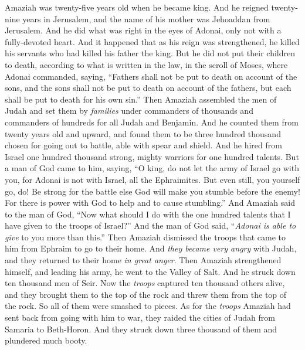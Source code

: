 \begin{biblechapter} %
 Amaziah was twenty-five years old when he became king. And he reigned twenty-nine years in Jerusalem, and the name of his mother was Jehoaddan from Jerusalem.
\verse And he did what was right in the eyes of Adonai, only not with a fully-devoted heart.
\verse And it happened that as his reign was strengthened, he killed his servants who had killed his father the king.
\verse But he did not put their children to death, according to what is written in the law, in the scroll of Moses, where Adonai commanded, saying, “Fathers shall not be put to death on account of the sons, and the sons shall not be put to death on account of the fathers, but each shall be put to death for his own sin.”
\verse Then Amaziah assembled the men of Judah and set them by \textit{families} under commanders of thousands and commanders of hundreds for all Judah and Benjamin. And he counted them from twenty years old and upward, and found them to be three hundred thousand chosen for going out to battle, able with spear and shield.
\verse And he hired from Israel one hundred thousand strong, mighty warriors for one hundred talents.
\verse But a man of God came to him, saying, “O king, do not let the army of Israel go with you, for Adonai is not with Israel, all the Ephraimites.
\verse But even still, you yourself go, do! Be strong for the battle else God will make you stumble before the enemy! For there is power with God to help and to cause stumbling.”
\verse And Amaziah said to the man of God, “Now what should I do with the one hundred talents that I have given to the troops of Israel?” And the man of God said, “\textit{Adonai is able to give} to you more than this.”
\verse Then Amaziah dismissed the troops that came to him from Ephraim to go to their home. And \textit{they became very angry} with Judah, and they returned to their home \textit{in great anger}.
\verse Then Amaziah strengthened himself, and leading his army, he went to the Valley of Salt. And he struck down ten thousand men of Seir.
\verse Now the \textit{troops} captured ten thousand others alive, and they brought them to the top of the rock and threw them from the top of the rock. So all of them were smashed to pieces.
\verse As for the \textit{troops} Amaziah had sent back from going with him to war, they raided the cities of Judah from Samaria to Beth-Horon. And they struck down three thousand of them and plundered much booty.

\end{biblechapter}
